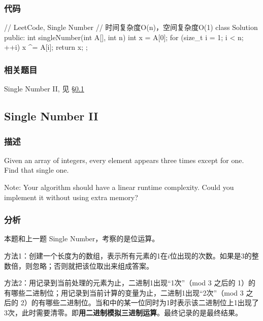 \subsubsection{代码}
\begin{Code}
// LeetCode, Single Number
// 时间复杂度O(n)，空间复杂度O(1)
class Solution {
public:
    int singleNumber(int A[], int n) {
        int x = A[0];
        for (size_t i = 1; i < n; ++i)
            x ^= A[i];
        return x;
    }
};
\end{Code}


\subsubsection{相关题目}
\begindot
\item  Single Number II, 见 \S \ref{sec:single-number-ii}
\myenddot


\subsection{Single Number II} %
\label{sec:single-number-ii}


\subsubsection{描述}
Given an array of integers, every element appears three times except for one. Find that single one.

Note:
Your algorithm should have a linear runtime complexity. Could you implement it without using extra memory?


\subsubsection{分析}
本题和上一题 Single Number，考察的是位运算。

方法1：创建一个长度为的数组，表示所有元素的1在$i$位出现的次数。如果是3的整数倍，则忽略；否则就把该位取出来组成答案。

方法2：用记录到当前处理的元素为止，二进制1出现“1次”（mod 3 之后的 1）的有哪些二进制位；用记录到当前计算的变量为止，二进制1出现“2次”（mod 3 之后的 2）的有哪些二进制位。当和中的某一位同时为1时表示该二进制位上1出现了3次，此时需要清零。即\textbf{用二进制模拟三进制运算}。最终记录的是最终结果。

